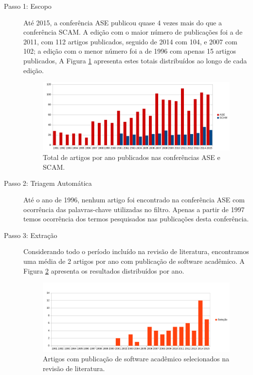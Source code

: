 \begin{description}

  \item [Passo 1: Escopo]

Até 2015, a conferência ASE publicou quase 4 vezes mais do que a conferência SCAM.
A edição com o maior número de publicações foi a de 2011, com 112 artigos publicados,
seguido de 2014 com 104, e 2007 com 102;  a edição com o menor número foi a de 1996
com apenas 15 artigos publicados, A Figura \ref{artigos-por-ano} apresenta estes
totais distribuídos ao longo de cada edição.

\begin{figure}[h]
  \center
  \includegraphics[scale=0.65]{imagens/artigos-por-ano.png}
  \caption{Total de artigos por ano publicados nas conferências ASE e SCAM.}
  \label{artigos-por-ano}
\end{figure}

  \item [Passo 2: Triagem Automática]

Até o ano de 1996, nenhum artigo foi encontrado na conferência ASE com
ocorrência das palavras-chave utilizadas no filtro. Apenas a partir de 1997
temos ocorrência dos termos pesquisados nas publicações desta conferência.

  \item [Passo 3: Extração]

Considerando todo o período incluído na revisão de literatura, encontramos uma
média de 2 artigos por ano com publicação de software acadêmico. A Figura
\ref{artigos-com-software-por-ano} apresenta os resultados distribuídos por
ano.

\begin{figure}[h]
  \center
  \includegraphics[scale=0.65]{imagens/artigos-com-software-por-ano.png}
  \caption{Artigos com publicação de software acadêmico selecionados na revisão de literatura.}
  \label{artigos-com-software-por-ano}
\end{figure}


\end{description}

